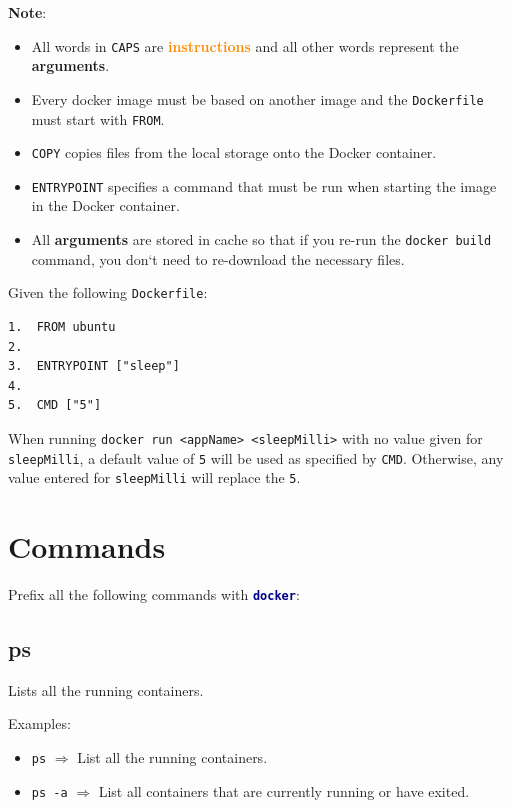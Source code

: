 \documentclass[a4paper, 12pt]{article}
\newcommand{\bc}[2]{\textbf{\textcolor{#1}{#2}}}
\begin{document}
\textbf{Note}:
\begin{itemize}
	\item All words in \texttt{CAPS} are \bc{darkorange}{instructions} and all
	other words represent the \bc{darkyellow}{arguments}.
	\item Every docker image must be based on another image and the
	\texttt{Dockerfile} must start with \texttt{FROM}.
	\item \texttt{COPY} copies files from the local storage onto the Docker
	container.
	\item \texttt{ENTRYPOINT} specifies a command that must be run when starting
	the image in the Docker container.
	\item All \bc{darkyellow}{arguments} are stored in cache so that if you
	re-run the \texttt{docker build} command, you don`t need to re-download the
	necessary files.
\end{itemize}

Given the following \texttt{Dockerfile}:
\begin{verbatim}
1.  FROM ubuntu
2.
3.  ENTRYPOINT ["sleep"]
4.
5.  CMD ["5"]
\end{verbatim}

When running \texttt{docker run <appName> <sleepMilli>} with no value given for
\texttt{sleepMilli}, a default value of \texttt{5} will be used as specified
by \texttt{CMD}. Otherwise, any value entered for \texttt{sleepMilli} will
replace the \texttt{5}.

\section{Commands}

Prefix all the following commands with \texttt{\bc{darkblue}{docker}}:

\subsection{ps}

Lists all the running containers.

\vspace{0.5em}
Examples:
\begin{itemize}
	\item \texttt{ps} $\Rightarrow$ List all the running containers.
	\item \texttt{ps -a} $\Rightarrow$ List all containers that are currently
	running or have exited.
\end{itemize}
\end{document}

